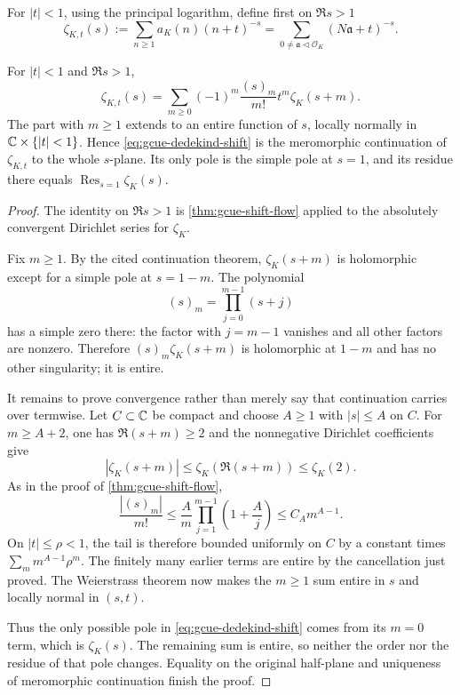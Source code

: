 For $|t|<1$, using the principal logarithm, define first on $\Re s>1$
\[
 \zeta_{K,t}(s)
 :=\sum_{n\ge1}a_K(n)(n+t)^{-s}
 =\sum_{0\ne\mathfrak a\lhd\mathcal O_K}(N\mathfrak a+t)^{-s}.
\]

\begin{theorem}
\label{thm:gcue-dedekind-shift}
For $|t|<1$ and $\Re s>1$,
\begin{equation}
 \zeta_{K,t}(s)
 =\sum_{m\ge0}(-1)^m\frac{(s)_m}{m!}t^m\zeta_K(s+m).
 \label{eq:gcue-dedekind-shift}
\end{equation}
The part with $m\ge1$ extends to an entire function of $s$, locally normally in
$\mathbb C\times\{|t|<1\}$.  Hence \eqref{eq:gcue-dedekind-shift} is the meromorphic
continuation of $\zeta_{K,t}$ to the whole $s$-plane.  Its only pole is the simple pole at
$s=1$, and its residue there equals $\operatorname*{Res}_{s=1}\zeta_K(s)$.
\end{theorem}

\begin{proof}
The identity on $\Re s>1$ is \cref{thm:gcue-shift-flow} applied to the absolutely
convergent Dirichlet series for $\zeta_K$.

Fix $m\ge1$.  By the cited continuation theorem, $\zeta_K(s+m)$ is holomorphic except
for a simple pole at $s=1-m$.  The polynomial
\[
 (s)_m=\prod_{j=0}^{m-1}(s+j)
\]
has a simple zero there: the factor with $j=m-1$ vanishes and all other factors are
nonzero.  Therefore $(s)_m\zeta_K(s+m)$ is holomorphic at $1-m$ and has no other
singularity; it is entire.

It remains to prove convergence rather than merely say that continuation carries over
termwise.  Let $C\subset\mathbb C$ be compact and choose $A\ge1$ with $|s|\le A$ on $C$.
For $m\ge A+2$, one has $\Re(s+m)\ge2$ and the nonnegative Dirichlet coefficients give
\[
 |\zeta_K(s+m)|\le\zeta_K(\Re(s+m))\le\zeta_K(2).
\]
As in the proof of \cref{thm:gcue-shift-flow},
\[
 \frac{|(s)_m|}{m!}
 \le \frac{A}{m}\prod_{j=1}^{m-1}\left(1+\frac Aj\right)
 \le C_A m^{A-1}.
\]
On $|t|\le\rho<1$, the tail is therefore bounded uniformly on $C$ by a constant times
$\sum_m m^{A-1}\rho^m$.  The finitely many earlier terms are entire by the cancellation
just proved.  The Weierstrass theorem now makes the $m\ge1$ sum entire in $s$ and locally
normal in $(s,t)$.

Thus the only possible pole in \eqref{eq:gcue-dedekind-shift} comes from its $m=0$ term,
which is $\zeta_K(s)$.  The remaining sum is entire, so neither the order nor the residue of
that pole changes.  Equality on the original half-plane and uniqueness of meromorphic
continuation finish the proof.
\end{proof}

